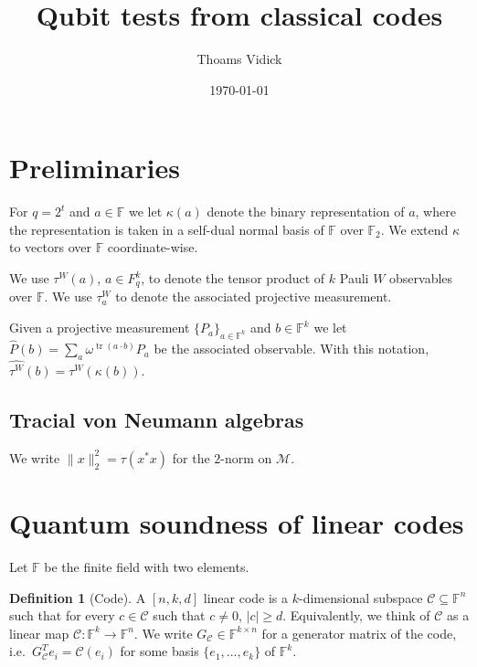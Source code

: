 \documentclass[11pt]{article}
\theoremstyle{definition}
\newtheorem{definition}[theorem]{Definition}
\newcommand{\code}{\mathcal{C}}
\newcommand{\field}{\mathbb{F}}
\newcommand{\F}{\ensuremath{\mathbb{F}}}
\newcommand{\mM}{\ensuremath{\mathcal{M}}}
\DeclareMathOperator{\tr}{tr}
\begin{document}
\title{Qubit tests from classical codes}

\author{Thoams Vidick}
\date{\today}
\maketitle

\noteswarning


\begin{abstract}

\end{abstract}

	\section{Preliminaries}
	
	For $q=2^t$ and $a\in \field$ we let $\kappa(a)$ denote the binary representation of $a$, where the representation is taken in a self-dual normal basis of $\field$ over $\F_2$. We extend $\kappa$ to vectors over $\field$ coordinate-wise.
	
	We use $\tau^W(a)$, $a\in F_q^k$, to denote the tensor product of $k$ Pauli $W$ observables over $\field$. We use $\tau^W_a$ to denote the associated projective measurement. 
	
	Given a projective measurement $\{P_a\}_{a\in \field^k}$ and $b\in \field^k$ we let $\widehat{P}(b) = \sum_a \omega^{\tr(a\cdot b)} P_a$ be the associated observable. With this notation, $\widehat{\tau^W}(b)=\tau^W(\kappa(b))$.
	
	\subsection{Tracial von Neumann algebras}
	
	We write $\|x\|_2^2=\tau(x^*x)$ for the $2$-norm on $\mM$.
	
\section{Quantum soundness of linear codes}

Let $\field$ be the finite field with two elements. 

\begin{definition}[Code]
A $[n,k,d]$ linear code is a $k$-dimensional subspace $\code\subseteq \field^n$ such that for every $c\in \code$ such that $c\neq 0$, $|c|\geq d$. Equivalently, we think of $\code$ as a linear map $\code:\field^k\to \field^n$. We write $G_\code \in \field^{k\times n}$ for a generator matrix of the code, i.e.\ $ G_\code^T e_i =\code(e_i)$ for some basis $\{e_1,\ldots,e_k\}$ of $\field^k$. 
\end{definition}
\end{document}
